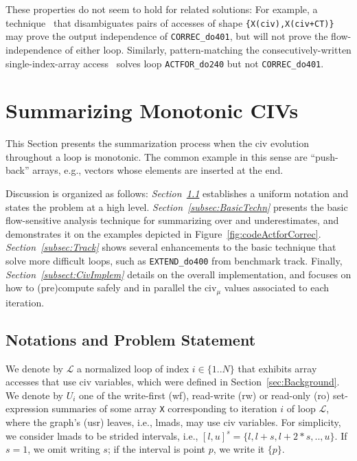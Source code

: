 \documentclass{sig-alternate}
\begin{document}
These properties do not seem to hold for related solutions: For example, 
a technique~\cite{CohenBeyondMon} that disambiguates pairs of accesses 
of shape {\tt \{X(civ),X(civ+CT)\}} may prove the output 
independence of {\tt CORREC\_do401}, but will not prove the flow-independence 
of either loop.
Similarly, pattern-matching the consecutively-written single-index-array
access~\cite{PaduaStackArr,VEG} solves loop  {\tt ACTFOR\_do240} but not
{\tt CORREC\_do401}.



\section{Summarizing Monotonic CIVs}
\label{sec:MonotonicCiv}

This Section presents the summarization process when the {\sc civ} 
evolution throughout a loop is monotonic. The common example
in this sense are ``push-back'' arrays, e.g., vectors whose elements
are inserted at the end.

Discussion is organized as follows:
{\em Section~\ref{subsec:ProblemHL}} establishes a uniform notation and
states the problem at a high level.
%
{\em Section~\ref{subsec:BasicTechn}} presents the basic flow-sensitive 
analysis technique for summarizing over and underestimates, and 
demonstrates it on the examples depicted in 
Figure~\ref{fig:codeActforCorrec}.
%
{\em Section~\ref{subsec:Track}} shows several enhancements
to the basic technique that solve %
more difficult loops, such as {\tt EXTEND\_do400} from benchmark {\sc track}. 
%
Finally, {\em Section~\ref{subsect:CivImplem}} details on the overall 
implementation, and focuses on how to (pre)compute safely and in parallel 
the {\sc civ}$_\mu$ values associated to each iteration.


\subsection{Notations and Problem Statement}
\label{subsec:ProblemHL}

We denote by $\mathcal{L}$ a normalized loop of index $i\in\{1..N\}$ that
exhibits array accesses that use {\sc civ} variables, which were defined
in Section~\ref{sec:Background}. %
%
We denote by $U_i$ one of the write-first ({\sc wf}), read-write ({\sc rw})
or read-only ({\sc ro}) set-expression summaries of some array {\tt X} corresponding to 
iteration $i$ of loop $\mathcal{L}$, where the graph's ({\sc usr}) leaves, i.e., {\sc lmad}s, 
may use {\sc civ} variables. 
%
For simplicity, we consider {\sc lmad}s to be 
strided intervals, i.e., $[l,u]^s=\{l, l+s, l+2*s, .., u\}$.
If $s=1$, we omit writing $s$; if the interval 
is point $p$, we write it $\{p\}$.
  
\end{document}
